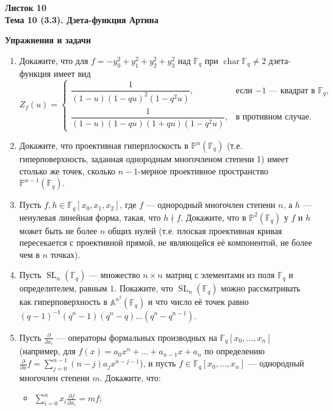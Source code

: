 \documentclass[a4paper, 11pt]{article}
\begin{document}
\begin{center} \Large \bf Листок 10\\ Тема 10 (3.3). Дзета-функция Артина \end{center}

\noindent\textbf{Упражнения и задачи}

\begin{enumerate}[topsep=0pt]
    \item Докажите, что для $f=-y_0^2+y_1^2+y_2^2+y_3^2$ над $\mathbb{F}_q$ при $\operatorname{char}\mathbb{F}_q\neq 2$ дзета-функция имеет вид
        \[
        Z_f(u)=
        \begin{cases}
        \dfrac{1}{(1-u)(1-qu)^2(1-q^2u)}, 
            & \text{если $-1$ --- квадрат в $\mathbb{F}_q$}, \\[2mm]
        \dfrac{1}{(1-u)(1-qu)(1+qu)(1-q^2u)}, 
            & \text{в противном случае}.
        \end{cases}
        \] %
    \item Докажите, что проективная гиперплоскость в $\mathbb{P}^n(\mathbb{F}_q)$ (т.е. гиперповерхность, заданная однородным многочленом степени 1) имеет столько же точек, сколько $n-1$-мерное проективное пространство $\mathbb{P}^{n-1}(\mathbb{F}_q)$. %
    \item Пусть $f,h\in\mathbb{F}_q[x_0,x_1,x_2]$, где $f$ --- однородный многочлен степени $n$, а $h$ --- ненулевая линейная форма, такая, что $h\nmid f$. Докажите, что в $\mathbb{P}^2(\mathbb{F}_q)$ у $f$ и $h$ может быть не более $n$ общих нулей (т.е. плоская проективная кривая пересекается с проективной прямой, не являющейся её компонентой, не более чем в $n$ точках). %
    \item Пусть $\operatorname{SL}_n(\mathbb{F}_q)$ --- множество $n\times n$ матриц с элементами из поля $\mathbb{F}_q$ и определителем, равным $1$. Покажите, что $\operatorname{SL}_n(\mathbb{F}_q)$ можно рассматривать как гиперповерхность в $\mathbb{A}^{n^2}(\mathbb{F}_q)$ и что число её точек равно $(q-1)^{-1} (q^n-1) (q^n-q) \dots (q^n-q^{n-1})$. %
    \item Пусть $\frac{\partial}{\partial x_i}$ --- операторы формальных производных на $\mathbb{F}_q[x_0,\dots,x_n]$ (например, для $f(x)=a_0 x^n +\dots + a_{n-1}x+a_n$ по определению $\frac{\partial}{\partial x} f=\sum_{j=0}^{n-1}(n-j)a_jx^{n-j-1}$), и пусть $f\in\mathbb{F}_q[x_0,\dots,x_n]$ --- однородный многочлен степени $m$. Докажите, что:
    \begin{itemize}[topsep=0pt]
        \item $\sum_{i=0}^n x_i \frac{\partial f}{\partial x_i} = mf$; %

\end{itemize}
\end{enumerate}
\end{document}
